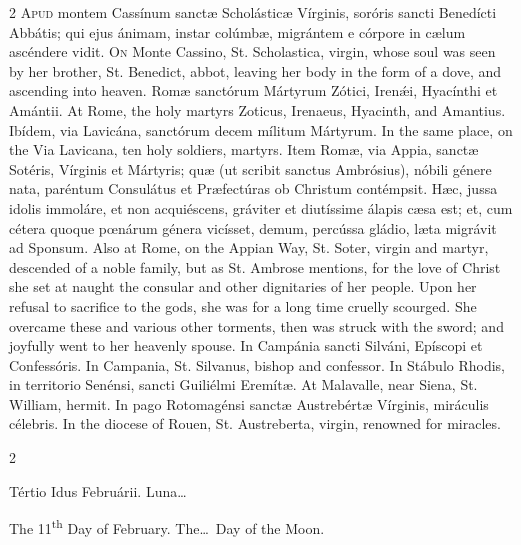 \begin{paracol}{2}
\lettrine[lines=2]{A}{pud} montem Cassínum sanctæ Scholásticæ 
 Vírginis, soróris sancti Benedícti Abbátis; qui ejus ánimam, instar colúmbæ, 
 migrántem e córpore in cælum ascéndere vidit.
\switchcolumn
{}
\lettrine[lines=2]{O}{n} Monte Cassino, St. Scholastica, virgin, whose soul was seen by her 
 brother, St. Benedict, abbot, leaving her body in the form of a dove, and 
 ascending into heaven.
\switchcolumn*
{}
Romæ sanctórum Mártyrum Zótici, Irenǽi, 
 Hyacínthi et Amántii.
\switchcolumn
{}
At Rome, the holy martyrs Zoticus, Irenaeus, Hyacinth, and Amantius.
\switchcolumn*
{}
Ibídem, via Lavicána, sanctórum decem mílitum Mártyrum.
\switchcolumn
{}
In the same place, on the Via Lavicana, ten holy soldiers, martyrs.
\switchcolumn*
{}
Item Romæ, via Appia, sanctæ Sotéris, Vírginis 
 et Mártyris; quæ (ut scribit sanctus Ambrósius), nóbili génere nata, paréntum 
 Consulátus et Præfectúras ob Christum contémpsit. Hæc, jussa idolis 
 immoláre, et non acquiéscens, gráviter et diutíssime álapis cæsa est; et, 
 cum cétera quoque pœnárum génera vicísset, demum, percússa gládio, læta 
 migrávit ad Sponsum.
\switchcolumn
{}
Also at Rome, on the Appian Way, St. Soter, virgin and martyr, descended of 
 a noble family, but as St. Ambrose mentions, for the love of Christ she set 
 at naught the consular and other dignitaries of her people. Upon her 
 refusal to sacrifice to the gods, she was for a long time cruelly scourged. 
 She overcame these and various other torments, then was struck with the 
 sword; and joyfully went to her heavenly spouse.
\switchcolumn*
{}
In Campánia sancti Silváni, Epíscopi et Confessóris.
\switchcolumn
{}
In Campania, St. Silvanus, bishop and confessor.
\switchcolumn*
{}
In Stábulo Rhodis, in territorio Senénsi, sancti Guiliélmi Eremítæ.
\switchcolumn
{}
At Malavalle, near Siena, St. William, hermit.
\switchcolumn*
{}
In pago Rotomagénsi sanctæ Austrebértæ Vírginis, 
 miráculis célebris.
\switchcolumn
{}
In the diocese of Rouen, St. Austreberta, virgin, renowned for miracles.
\switchcolumn*
{}
\end{paracol}


\begin{paracol}{2}
\begin{center}{\color{gregoriocolor} Tértio Idus Februárii. 
 Luna\dots\ }\end{center}
\switchcolumn
{}
\begin{center}{\color{gregoriocolor} The 11\textsuperscript{th} Day of 
 February. The\dots\ Day of the Moon.}\end{center}
\end{paracol}


